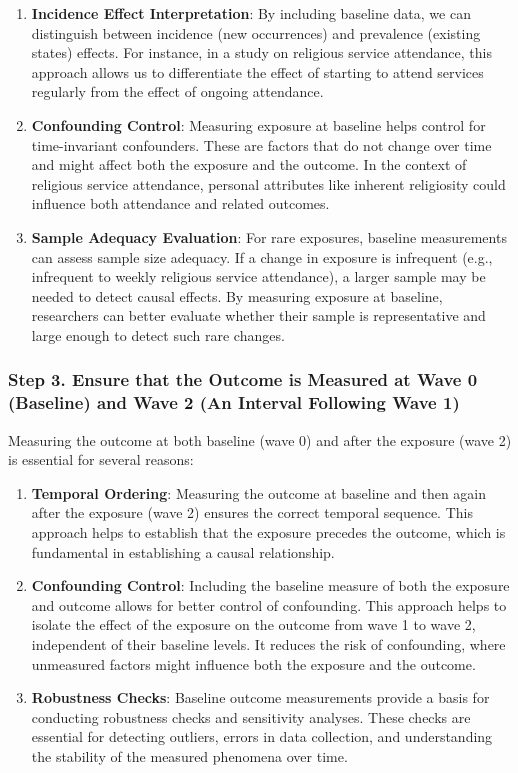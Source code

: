 \documentclass[
  singlecolumn,
  9pt]{article}
\begin{document}
\begin{enumerate}
\def\labelenumi{\arabic{enumi}.}
\item
  \textbf{Incidence Effect Interpretation}: By including baseline data,
  we can distinguish between incidence (new occurrences) and prevalence
  (existing states) effects. For instance, in a study on religious
  service attendance, this approach allows us to differentiate the
  effect of starting to attend services regularly from the effect of
  ongoing attendance.
\item
  \textbf{Confounding Control}: Measuring exposure at baseline helps
  control for time-invariant confounders. These are factors that do not
  change over time and might affect both the exposure and the outcome.
  In the context of religious service attendance, personal attributes
  like inherent religiosity could influence both attendance and related
  outcomes.
\item
  \textbf{Sample Adequacy Evaluation}: For rare exposures, baseline
  measurements can assess sample size adequacy. If a change in exposure
  is infrequent (e.g., infrequent to weekly religious service
  attendance), a larger sample may be needed to detect causal effects.
  By measuring exposure at baseline, researchers can better evaluate
  whether their sample is representative and large enough to detect such
  rare changes.
\end{enumerate}

\subsubsection{Step 3. Ensure that the Outcome is Measured at Wave 0
(Baseline) and Wave 2 (An Interval Following Wave
1)}\label{step-3.-ensure-that-the-outcome-is-measured-at-wave-0-baseline-and-wave-2-an-interval-following-wave-1}

Measuring the outcome at both baseline (wave 0) and after the exposure
(wave 2) is essential for several reasons:

\begin{enumerate}
\def\labelenumi{\arabic{enumi}.}
\item
  \textbf{Temporal Ordering}: Measuring the outcome at baseline and then
  again after the exposure (wave 2) ensures the correct temporal
  sequence. This approach helps to establish that the exposure precedes
  the outcome, which is fundamental in establishing a causal
  relationship.
\item
  \textbf{Confounding Control}: Including the baseline measure of both
  the exposure and outcome allows for better control of confounding.
  This approach helps to isolate the effect of the exposure on the
  outcome from wave 1 to wave 2, independent of their baseline levels.
  It reduces the risk of confounding, where unmeasured factors might
  influence both the exposure and the outcome.
\item
  \textbf{Robustness Checks}: Baseline outcome measurements provide a
  basis for conducting robustness checks and sensitivity analyses. These
  checks are essential for detecting outliers, errors in data
  collection, and understanding the stability of the measured phenomena
  over time.
\end{enumerate}
\end{document}
